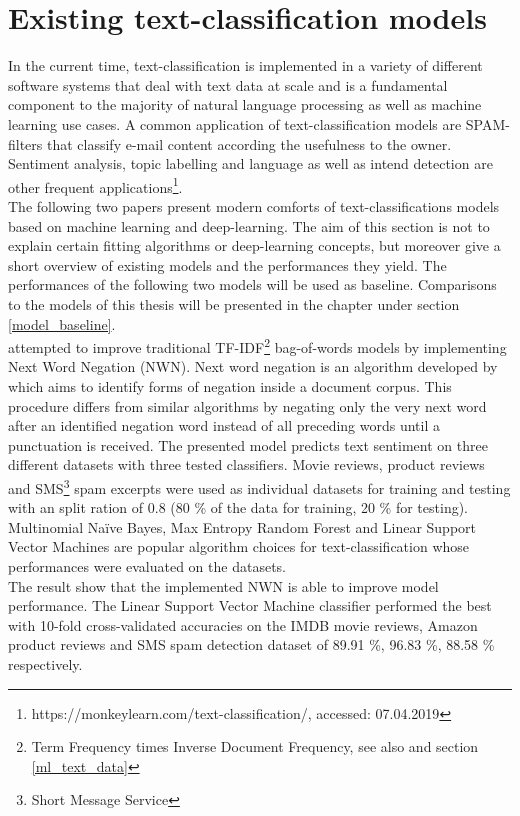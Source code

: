 \section{Existing text-classification models}\label{existing_text_class_models}
In the current time, text-classification is implemented in a variety of different software systems that deal with text data at scale and is a fundamental component to the majority of natural language processing as well as machine learning use cases. A common application of text-classification models are SPAM-filters that classify e-mail content according the usefulness to the owner. Sentiment analysis, topic labelling and language as well as intend detection are other frequent applications\footnote{https://monkeylearn.com/text-classification/, accessed: 07.04.2019}.\\
The following two papers present modern comforts of text-classifications models based on machine learning and deep-learning. The aim of this section is not to explain certain fitting algorithms or deep-learning concepts, but moreover give a short overview of existing models and the performances they yield. The performances of the following two models will be used as baseline. Comparisons to the models of this thesis will be presented in the  chapter under section \ref{model_baseline}. \\

\textcite{Das2018} attempted to improve traditional TF-IDF\footnote{Term Frequency times Inverse Document Frequency, see also  and section \ref{ml_text_data}} bag-of-words models by implementing Next Word Negation (NWN). Next word negation is an algorithm developed by \textcite{Das2018} which aims to identify forms of negation inside a document corpus. This procedure differs from similar algorithms by negating only the very next word after an identified negation word instead of all preceding words until a punctuation is received. The presented model predicts text sentiment on three different datasets with three tested classifiers. Movie reviews, product reviews and SMS\footnote{Short Message Service} spam excerpts were used as individual datasets for training and testing with an split ration of 0.8 (80 \% of the data for training, 20 \%  for testing). Multinomial Na\"ive Bayes, Max Entropy Random Forest and Linear Support Vector Machines are popular algorithm choices for text-classification whose performances were evaluated on the datasets. \\
The result show that the implemented NWN is able to improve model performance. The Linear Support Vector Machine classifier performed the best with 10-fold cross-validated accuracies on the IMDB movie reviews, Amazon product reviews and SMS spam detection dataset of 89.91 \%, 96.83 \%, 88.58 \% respectively. \\

